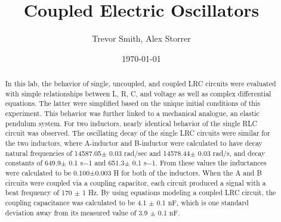 \documentclass[aps,prl,reprint]{revtex4-2}
\begin{document}

\title{Coupled Electric Oscillators}


\author{Trevor Smith, Alex Storrer}


\date{\today}

\begin{abstract}

	In this lab, the behavior of single, uncoupled, and coupled LRC circuits
	were evaluated with simple relationships between L, R, C, and voltage
	as well as complex differential equations. The latter were simplified
	based on the unique initial conditions of this experiment. This behavior
	was further linked to a mechanical analogue, an elastic pendulum system.
	For two inductors, nearly identical behavior of the single RLC circuit was
	observed.  The oscillating decay of the single LRC
	circuits  were  similar  for  the  two  inductors, where A-inductor
	and B-inductor were calculated to have decay  natural 
	frequencies  of  14587.05$\pm$ 0.03  rad/sec and 14578.44$\pm$ 0.03 rad/s, and
	decay constants of 649.9$\pm$ 0.1 s−1 and 651.3$\pm$ 0.1 s−1.  From these
	values the inductances were calculated to be 0.100±0.003 H for both of 
	the inductors. When the A and B circuits were coupled via a coupling
	capacitor, each circuit produced a signal with a beat frequency of 
	170 $\pm$ 1 Hz. By using equations modeling a coupled LRC circuit, the
	coupling capacitance was calculated to be 4.1 $\pm$ 0.1 nF, which is one
	standard deviation away from its measured value of 3.9 $\pm$ 0.1 nF.

\end{abstract}
\end{document}
